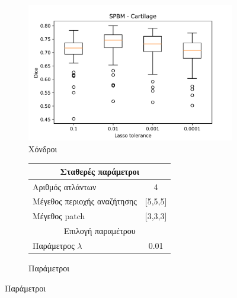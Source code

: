 \documentclass{beamer}
\begin{document}
\begin{frame}
\begin{figure}[H]
    \begin{subfigure}[b]{0.42\linewidth}
    \includegraphics[width=\linewidth]{SPBM_Lasso_tolerance_Cartilage_plot.png}
    \caption{Χόνδροι}
    \end{subfigure}
    \begin{subfigure}[b]{0.42\linewidth}
        \begin{tabular}[t]{|l|c|} 
            \multicolumn{2}{c}{\footnotesize Σταθερές παράμετροι} \\
            \hline
            \footnotesize Αριθμός ατλάντων & \footnotesize  4 \\ 
            \hline
            \footnotesize Μέγεθος περιοχής αναζήτησης & \footnotesize  [5,5,5] \\ 
            \hline
            \footnotesize Μέγεθος patch & \footnotesize [3,3,3] \\
            \hline
            \multicolumn{2}{c}{\footnotesize Επιλογή παραμέτρου} \\
            \hline
            \footnotesize Παράμετρος $\lambda$ & \footnotesize 0.01 \\
            \hline
        \end{tabular}
    \caption{Παράμετροι}
    \end{subfigure}
\end{figure}

\end{frame}
\end{document}
